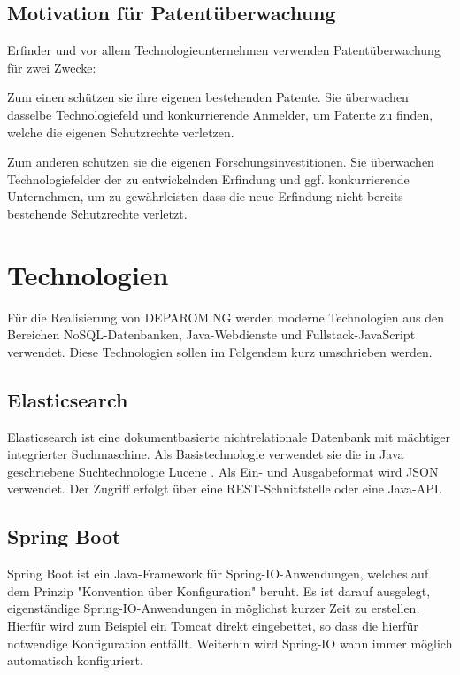 \subsection{Motivation für Patentüberwachung}
\label{ch:fachlichesUmfeld:PatentspezifischeBegriffe:Motivation}

Erfinder und vor allem Technologieunternehmen verwenden Patentüberwachung für
zwei Zwecke:

Zum einen schützen sie ihre eigenen bestehenden Patente. Sie überwachen dasselbe
Technologiefeld und konkurrierende Anmelder, um Patente zu finden, welche die
eigenen Schutzrechte verletzen.

Zum anderen schützen sie die eigenen Forschungsinvestitionen. Sie überwachen
Technologiefelder der zu entwickelnden Erfindung und ggf. konkurrierende
Unternehmen, um zu gewährleisten dass die neue Erfindung nicht bereits
bestehende Schutzrechte verletzt.

\section{Technologien}
\label{ch:fachlichesUmfeld:Technologien}

Für die Realisierung von DEPAROM.NG werden moderne Technologien aus den Bereichen
NoSQL-Datenbanken, Java-Webdienste und Fullstack-JavaScript verwendet. Diese
Technologien sollen im Folgendem kurz umschrieben werden.

\subsection{Elasticsearch}
\label{ch:fachlichesUmfeld:Technologien:Elastichsearch}

Elasticsearch ist eine dokumentbasierte nichtrelationale Datenbank mit mächtiger
integrierter Suchmaschine. Als Basistechnologie verwendet sie die in Java
geschriebene Suchtechnologie Lucene \cite{lucene}. Als Ein- und Ausgabeformat
wird JSON verwendet. Der Zugriff erfolgt über eine REST-Schnittstelle oder eine
Java-API.

\subsection{Spring Boot}
\label{ch:fachlichesUmfeld:Technologien:SpringBoot}

Spring Boot ist ein Java-Framework für Spring-IO-Anwendungen, welches auf dem
Prinzip "Konvention über Konfiguration" beruht. Es ist darauf ausgelegt,
eigenständige Spring-IO-Anwendungen in möglichst kurzer Zeit zu erstellen.
Hierfür wird zum Beispiel ein Tomcat direkt eingebettet, so dass die  hierfür
notwendige Konfiguration entfällt. Weiterhin wird Spring-IO wann immer möglich
automatisch konfiguriert.

